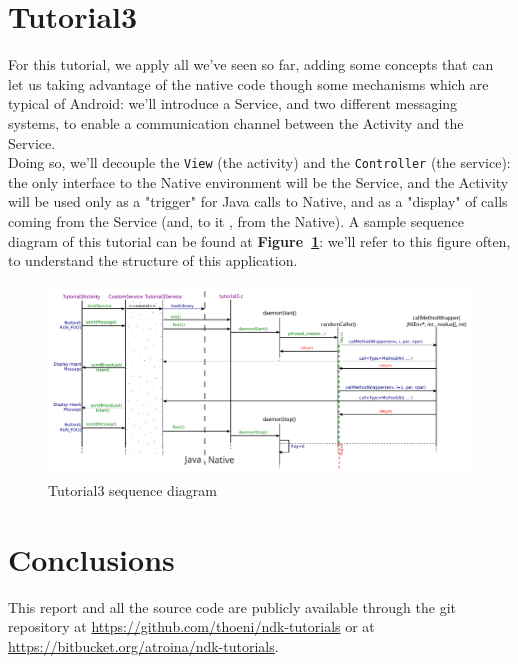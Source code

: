 \documentclass[a4paper,10pt]{article}
\newcommand{\keyword}[1]{\texttt{#1}}
\newcommand{\reff}[1]{\textbf{Figure~\ref{#1}}}
\begin{document}
\begin{multicols}{2}

\section{Tutorial3}

For this tutorial, we apply all we've seen so far, adding some concepts that can
let us taking advantage of the native code though some mechanisms which are
typical of Android: we'll introduce a Service, and two different messaging
systems, to enable a communication channel between the Activity and the Service.
\\Doing so, we'll decouple the \keyword{View} (the activity) and the 
\keyword{Controller} (the service): the only interface to the Native environment
will be the Service, and the Activity will be used only as a "trigger" for Java
calls to Native, and as a "display" of calls coming from the Service (and, to it
, from the Native). A sample sequence diagram of this tutorial can be found at
\reff{fig:tut3-seq}: we'll refer to this figure often, to understand the
structure of this application.

\begin{figure}[b]
 \includegraphics[width=17cm]{./figures/sequence_t3.pdf}
 \caption{Tutorial3 sequence diagram}
 \label{fig:tut3-seq}
\end{figure}




\section{Conclusions}

This report and all the source code are publicly available through the git
repository at \url{https://github.com/thoeni/ndk-tutorials} or at
\url{https://bitbucket.org/atroina/ndk-tutorials}.

\nocite{liang1999jni}
\nocite{marakanajni}
\nocite{learningandroid}
\nocite{programmingandroid}




\end{multicols}
\end{document}
